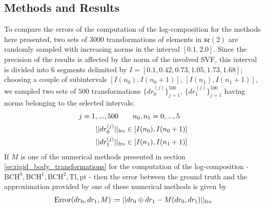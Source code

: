 \subsection{Methods and Results}

To compare the errors of the computation of the log-composition for the methods here presented, two sets of $3000$ transformations of elements in $\mathfrak{se}(2)$ are randomly sampled with increasing norms in the interval $[0.1, 2.0]$. Since the precision of the results is affected by the norm of the involved SVF, this interval is divided into 6 segments delimited by $I = [0.1, 0.42, 0.73, 1.05, 1.73, 1.68 ]$; choosing a couple of subintervals $[I(n_0), I(n_0+1)]$, $[I(n_1), I(n_1+1)]$, we sampled two sets of $500$ transformations $\{ dr_{0}^{(j)}\}_{j=1}^{500}$, $\{ dr_{1}^{(j)} \}_{j=1}^{500}$ having norms belonging to the selected intervals:
\begin{align*}
j=1,...,500 \quad &\quad  n_0, n_1 = 0,...,5 \\
\vert\lvert dr_{0}^{(j)} \rvert\vert_{\text{fro}} &\in [I(n_0), I(n_0+1)] \\
\vert\lvert dr_{1}^{(j)} \rvert\vert_{\text{fro}} &\in [I(n_1), I(n_1+1)]  
\end{align*} 
If $M$ is one of the numerical methods presented in section \ref{se:rigid_body_transformations} for the computation of the log-composition - $\text{BCH}^{0}, \text{BCH}^{1}, \text{BCH}^{2}, \text{Tl}, \text{pt}$ - 
then the error between the ground truth and the approximation provided by one of these numerical methods is given by
\begin{align*}
\text{Error}(dr_{0},dr_{1},M) 
:= 
\vert\lvert dr_{0} \oplus dr_{1}
- 
M(dr_{0}, dr_{1})  \rvert\vert_{\text{fro}} 
\end{align*}

